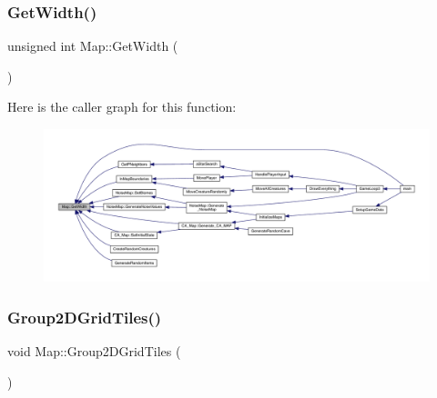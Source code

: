 \subsubsection{\texorpdfstring{Get\+Width()}{GetWidth()}}
{\footnotesize\ttfamily unsigned int Map\+::\+Get\+Width (\begin{DoxyParamCaption}{ }\end{DoxyParamCaption})}

Here is the caller graph for this function\+:
\nopagebreak
\begin{figure}[H]
\begin{center}
\leavevmode
\includegraphics[width=350pt]{dd/d11/class_map_a1e9263abe2e1290fc383586c327f9f4a_icgraph}
\end{center}
\end{figure}
\mbox{\label{class_map_af2b4481fa4588c8aa5ab6e8c45c5f7cf}} 
\subsubsection{\texorpdfstring{Group2\+D\+Grid\+Tiles()}{Group2DGridTiles()}}
{\footnotesize\ttfamily void Map\+::\+Group2\+D\+Grid\+Tiles (\begin{DoxyParamCaption}{ }\end{DoxyParamCaption})}

